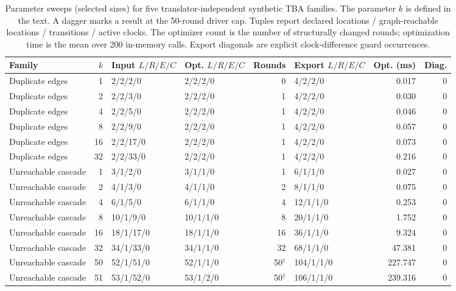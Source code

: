 \begin{table}[t]
\centering
\caption{Parameter sweeps (selected sizes) for five translator-independent synthetic TBA families. The parameter $k$ is defined in the text. A dagger marks a result at the 50-round driver cap. Tuples report declared locations / graph-reachable locations / transitions / active clocks. The optimizer count is the number of structurally changed rounds; optimization time is the mean over 200 in-memory calls. Export diagonals are explicit clock-difference guard occurrences.}
\label{tab:parameterized-synthetic}
\scriptsize
\setlength{\tabcolsep}{2.5pt}
\begin{adjustbox}{max width=\textwidth}\begin{tabular}{@{}p{}r p{}p{}r p{}rr@{}}
\toprule
Family & $k$ & Input $L/R/E/C$ & Opt. $L/R/E/C$ & Rounds & Export $L/R/E/C$ & Opt. (ms) & Diag.\\
\midrule
Duplicate edges & 1 & 2/2/2/0 & 2/2/2/0 & 0 & 4/2/2/0 & 0.017 & 0 \\
Duplicate edges & 2 & 2/2/3/0 & 2/2/2/0 & 1 & 4/2/2/0 & 0.030 & 0 \\
Duplicate edges & 4 & 2/2/5/0 & 2/2/2/0 & 1 & 4/2/2/0 & 0.046 & 0 \\
Duplicate edges & 8 & 2/2/9/0 & 2/2/2/0 & 1 & 4/2/2/0 & 0.057 & 0 \\
Duplicate edges & 16 & 2/2/17/0 & 2/2/2/0 & 1 & 4/2/2/0 & 0.073 & 0 \\
Duplicate edges & 32 & 2/2/33/0 & 2/2/2/0 & 1 & 4/2/2/0 & 0.216 & 0 \\
Unreachable cascade & 1 & 3/1/2/0 & 3/1/1/0 & 1 & 6/1/1/0 & 0.027 & 0 \\
Unreachable cascade & 2 & 4/1/3/0 & 4/1/1/0 & 2 & 8/1/1/0 & 0.075 & 0 \\
Unreachable cascade & 4 & 6/1/5/0 & 6/1/1/0 & 4 & 12/1/1/0 & 0.253 & 0 \\
Unreachable cascade & 8 & 10/1/9/0 & 10/1/1/0 & 8 & 20/1/1/0 & 1.752 & 0 \\
Unreachable cascade & 16 & 18/1/17/0 & 18/1/1/0 & 16 & 36/1/1/0 & 9.324 & 0 \\
Unreachable cascade & 32 & 34/1/33/0 & 34/1/1/0 & 32 & 68/1/1/0 & 47.381 & 0 \\
Unreachable cascade & 50 & 52/1/51/0 & 52/1/1/0 & 50$^\dagger$ & 104/1/1/0 & 227.747 & 0 \\
Unreachable cascade & 51 & 53/1/52/0 & 53/1/2/0 & 50$^\dagger$ & 106/1/1/0 & 239.316 & 0 \\

\end{tabular}
\end{adjustbox}
\end{table}
